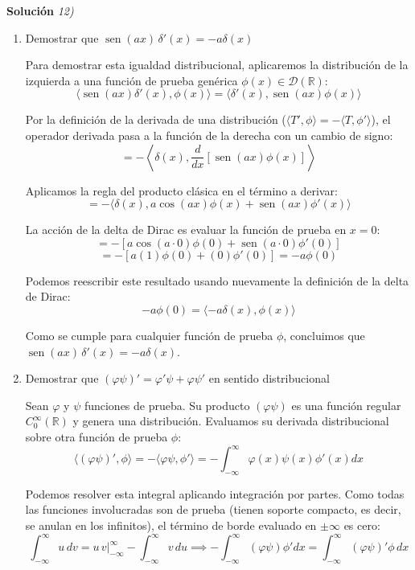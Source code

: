 \documentclass[11pt,spanish]{article}
\begin{document}
\vspace{0.5cm}
{\bf Soluci\'on }{\em 12)}
\vspace{0.5cm}

\begin{enumerate}

\item Demostrar que $\operatorname{sen}(ax)\,\delta'(x) = -a\delta(x)$

Para demostrar esta igualdad distribucional, aplicaremos la distribución de la izquierda a una función de prueba genérica $\phi(x) \in \mathcal{D}(\mathbb{R})$:
$$\langle \operatorname{sen}(ax)\delta'(x), \phi(x) \rangle = \langle \delta'(x), \operatorname{sen}(ax)\phi(x) \rangle$$

Por la definición de la derivada de una distribución ($\langle T', \phi \rangle = -\langle T, \phi' \rangle$), el operador derivada pasa a la función de la derecha con un cambio de signo:
$$= -\left\langle \delta(x), \frac{d}{dx}[\operatorname{sen}(ax)\phi(x)] \right\rangle$$

Aplicamos la regla del producto clásica en el término a derivar:
$$= -\langle \delta(x), a\cos(ax)\phi(x) + \operatorname{sen}(ax)\phi'(x) \rangle$$

La acción de la delta de Dirac es evaluar la función de prueba en $x=0$:
$$= -\left[ a\cos(a\cdot 0)\phi(0) + \operatorname{sen}(a\cdot 0)\phi'(0) \right]$$
$$= -\left[ a(1)\phi(0) + (0)\phi'(0) \right] = -a\phi(0)$$

Podemos reescribir este resultado usando nuevamente la definición de la delta de Dirac:
$$-a\phi(0) = \langle -a\delta(x), \phi(x) \rangle$$

Como se cumple para cualquier función de prueba $\phi$, concluimos que $\operatorname{sen}(ax)\,\delta'(x) = -a\delta(x)$.

\item Demostrar que $(\varphi\psi)' = \varphi'\psi + \varphi\psi'$ en sentido distribucional

Sean $\varphi$ y $\psi$ funciones de prueba. Su producto $(\varphi\psi)$ es una función regular $C_0^\infty(\mathbb{R})$ y genera una distribución. Evaluamos su derivada distribucional sobre otra función de prueba $\phi$:
$$\langle (\varphi\psi)', \phi \rangle = -\langle \varphi\psi, \phi' \rangle = -\int_{-\infty}^{\infty} \varphi(x)\psi(x)\phi'(x) dx$$

Podemos resolver esta integral aplicando integración por partes. Como todas las funciones involucradas son de prueba (tienen soporte compacto, es decir, se anulan en los infinitos), el término de borde evaluado en $\pm\infty$ es cero:
$$\int_{-\infty}^{\infty} u \, dv = u \, v\Big|_{-\infty}^{\infty} - \int_{-\infty}^{\infty} v \, du \implies -\int_{-\infty}^{\infty} (\varphi\psi) \phi' dx = \int_{-\infty}^{\infty} (\varphi\psi)' \phi \, dx$$


\end{enumerate}
\end{document}
